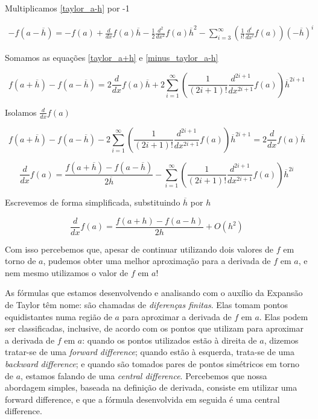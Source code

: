 \documentclass[]{article}
\numberwithin{equation}{section}
\begin{document}
Multiplicamos \eqref{taylor_a-h} por -1

\begin{align}
- f(a - \overline{h}) = - f(a) + \frac{d}{dx} f(a)\overline{h} - \frac{1}{2} \frac{d^2}{dx^2} f(a) \overline{h}^2 - \sum_{i = 3}^{\infty} \left(\frac{1}{i!} \frac{d^i}{dx^i} f(a)\right) (-\overline{h})^i \label{minus_taylor_a-h}
\end{align}

Somamos as equações \eqref{taylor_a+h} e \eqref{minus_taylor_a-h}

$$
f(a + \overline{h}) - f(a - \overline{h}) = 2 \frac{d}{dx} f(a)\overline{h} + 2 \sum_{i = 1}^{\infty} \left(\frac{1}{(2i + 1)!} \frac{d^{2i + 1}}{dx^{2i + 1}} f(a)\right) \overline{h}^{2i + 1}
$$

Isolamos $\frac{d}{dx} f(a)$

$$
f(a + \overline{h}) - f(a - \overline{h}) - 2 \sum_{i = 1}^{\infty} \left(\frac{1}{(2i + 1)!} \frac{d^{2i + 1}}{dx^{2i + 1}} f(a)\right) \overline{h}^{2i + 1} = 2 \frac{d}{dx} f(a)\overline{h}
$$

$$
\frac{d}{dx} f(a) = \frac{f(a + \overline{h}) - f(a - \overline{h})}{2 \overline{h}} - \sum_{i = 1}^{\infty} \left(\frac{1}{(2i + 1)!} \frac{d^{2i + 1}}{dx^{2i + 1}} f(a)\right) \overline{h}^{2i}
$$

Escrevemos de forma simplificada, substituindo $\overline{h}$ por $h$

$$
\frac{d}{dx} f(a) = \frac{f(a + h) - f(a - h)}{2 h} + O(h^2)
$$

Com isso percebemos que, apesar de continuar utilizando dois valores de $f$ em torno de $a$, pudemos obter uma melhor aproximação para a derivada de $f$ em $a$, e nem mesmo utilizamos o valor de $f$ em $a$!

As fórmulas que estamos desenvolvendo e analisando com o auxílio da Expansão de Taylor têm nome: são chamadas de \emph{diferenças finitas}. Elas tomam pontos equidistantes numa região de $a$ para aproximar a derivada de $f$ em $a$. Elas podem ser classificadas, inclusive, de acordo com os pontos que utilizam para aproximar a derivada de $f$ em $a$: quando os pontos utilizados estão à direita de $a$, dizemos tratar-se de uma \emph{forward difference}; quando estão à esquerda, trata-se de uma \emph{backward difference}; e quando são tomados pares de pontos simétricos em torno de $a$, estamos falando de uma \emph{central difference}. Percebemos que nossa abordagem simples, baseada na definição de derivada, consiste em utilizar uma forward difference, e que a fórmula desenvolvida em seguida é uma central difference.
\end{document}
